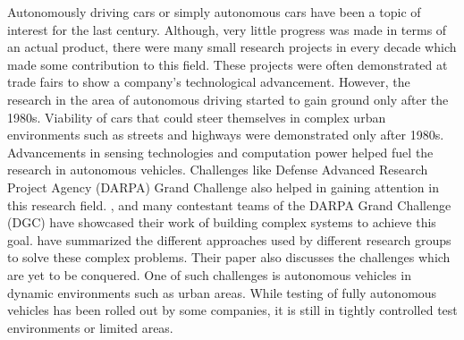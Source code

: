 Autonomously driving cars or simply autonomous cars have been a topic of interest for the last century. Although, very little progress was made in terms of an actual product, there were many small research projects in every decade which made some contribution to this field. These projects were often demonstrated at trade fairs to show a company's technological advancement. However, the research in the area of autonomous driving started to gain ground only after the 1980s. Viability of cars that could steer themselves in complex urban environments such as streets and highways were demonstrated only after 1980s. Advancements in sensing technologies and computation power helped fuel the research in autonomous vehicles. Challenges like Defense Advanced Research Project Agency (DARPA) Grand Challenge also helped in gaining attention in this research field. \citet{dickmanns2002development}, \citet{thorpe1991toward} and many contestant teams of the DARPA Grand Challenge (DGC) have showcased their work of building complex systems to achieve this goal. \citet{campbell2010autonomous} have summarized the different approaches used by different research groups to solve these complex problems. Their paper also discusses the challenges which are yet to be conquered. One of such challenges is autonomous vehicles in dynamic environments such as urban areas. While testing of fully autonomous vehicles has been rolled out by some companies, it is still in tightly controlled test environments or limited areas. \\


